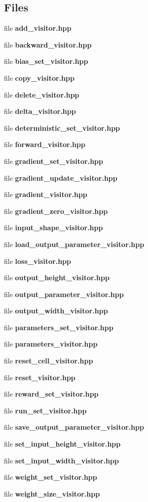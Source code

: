 \subsection*{Files}
\begin{DoxyCompactItemize}
\item 
file \textbf{ add\+\_\+visitor.\+hpp}
\item 
file \textbf{ backward\+\_\+visitor.\+hpp}
\item 
file \textbf{ bias\+\_\+set\+\_\+visitor.\+hpp}
\item 
file \textbf{ copy\+\_\+visitor.\+hpp}
\item 
file \textbf{ delete\+\_\+visitor.\+hpp}
\item 
file \textbf{ delta\+\_\+visitor.\+hpp}
\item 
file \textbf{ deterministic\+\_\+set\+\_\+visitor.\+hpp}
\item 
file \textbf{ forward\+\_\+visitor.\+hpp}
\item 
file \textbf{ gradient\+\_\+set\+\_\+visitor.\+hpp}
\item 
file \textbf{ gradient\+\_\+update\+\_\+visitor.\+hpp}
\item 
file \textbf{ gradient\+\_\+visitor.\+hpp}
\item 
file \textbf{ gradient\+\_\+zero\+\_\+visitor.\+hpp}
\item 
file \textbf{ input\+\_\+shape\+\_\+visitor.\+hpp}
\item 
file \textbf{ load\+\_\+output\+\_\+parameter\+\_\+visitor.\+hpp}
\item 
file \textbf{ loss\+\_\+visitor.\+hpp}
\item 
file \textbf{ output\+\_\+height\+\_\+visitor.\+hpp}
\item 
file \textbf{ output\+\_\+parameter\+\_\+visitor.\+hpp}
\item 
file \textbf{ output\+\_\+width\+\_\+visitor.\+hpp}
\item 
file \textbf{ parameters\+\_\+set\+\_\+visitor.\+hpp}
\item 
file \textbf{ parameters\+\_\+visitor.\+hpp}
\item 
file \textbf{ reset\+\_\+cell\+\_\+visitor.\+hpp}
\item 
file \textbf{ reset\+\_\+visitor.\+hpp}
\item 
file \textbf{ reward\+\_\+set\+\_\+visitor.\+hpp}
\item 
file \textbf{ run\+\_\+set\+\_\+visitor.\+hpp}
\item 
file \textbf{ save\+\_\+output\+\_\+parameter\+\_\+visitor.\+hpp}
\item 
file \textbf{ set\+\_\+input\+\_\+height\+\_\+visitor.\+hpp}
\item 
file \textbf{ set\+\_\+input\+\_\+width\+\_\+visitor.\+hpp}
\item 
file \textbf{ weight\+\_\+set\+\_\+visitor.\+hpp}
\item 
file \textbf{ weight\+\_\+size\+\_\+visitor.\+hpp}
\end{DoxyCompactItemize}
